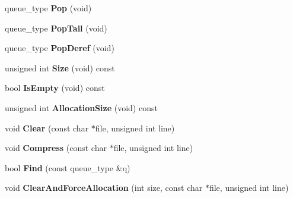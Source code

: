 \begin{DoxyCompactItemize}
\item 
\hypertarget{class_data_structures_1_1_queue_a25272370e684388afd807c5369e4ef87}{queue\-\_\-type {\bfseries Pop} (void)}\label{class_data_structures_1_1_queue_a25272370e684388afd807c5369e4ef87}

\item 
\hypertarget{class_data_structures_1_1_queue_aea8839196a7bb3453a8a8b0606ce71a1}{queue\-\_\-type {\bfseries Pop\-Tail} (void)}\label{class_data_structures_1_1_queue_aea8839196a7bb3453a8a8b0606ce71a1}

\item 
\hypertarget{class_data_structures_1_1_queue_a803a870f52e2755e00686b762bb53da2}{queue\-\_\-type {\bfseries Pop\-Deref} (void)}\label{class_data_structures_1_1_queue_a803a870f52e2755e00686b762bb53da2}

\item 
\hypertarget{class_data_structures_1_1_queue_ae2aec093c82f780558c23f8ae9f296b8}{unsigned int {\bfseries Size} (void) const }\label{class_data_structures_1_1_queue_ae2aec093c82f780558c23f8ae9f296b8}

\item 
\hypertarget{class_data_structures_1_1_queue_a8a535ff9f0dceecedf31401490da3a31}{bool {\bfseries Is\-Empty} (void) const }\label{class_data_structures_1_1_queue_a8a535ff9f0dceecedf31401490da3a31}

\item 
\hypertarget{class_data_structures_1_1_queue_a30ed169295af652897a9dd66c4c8403d}{unsigned int {\bfseries Allocation\-Size} (void) const }\label{class_data_structures_1_1_queue_a30ed169295af652897a9dd66c4c8403d}

\item 
\hypertarget{class_data_structures_1_1_queue_a481276f70b05ecba8138cd67e51509ec}{void {\bfseries Clear} (const char $\ast$file, unsigned int line)}\label{class_data_structures_1_1_queue_a481276f70b05ecba8138cd67e51509ec}

\item 
\hypertarget{class_data_structures_1_1_queue_af25ea11c6d2c125fc8880ce99dee1573}{void {\bfseries Compress} (const char $\ast$file, unsigned int line)}\label{class_data_structures_1_1_queue_af25ea11c6d2c125fc8880ce99dee1573}

\item 
\hypertarget{class_data_structures_1_1_queue_aaeea4fc7d36a0a3545f47bc451cb9d91}{bool {\bfseries Find} (const queue\-\_\-type \&q)}\label{class_data_structures_1_1_queue_aaeea4fc7d36a0a3545f47bc451cb9d91}

\item 
\hypertarget{class_data_structures_1_1_queue_ad1a69d9152ba602aae0ac6edad876d9d}{void {\bfseries Clear\-And\-Force\-Allocation} (int size, const char $\ast$file, unsigned int line)}\label{class_data_structures_1_1_queue_ad1a69d9152ba602aae0ac6edad876d9d}

\end{DoxyCompactItemize}


